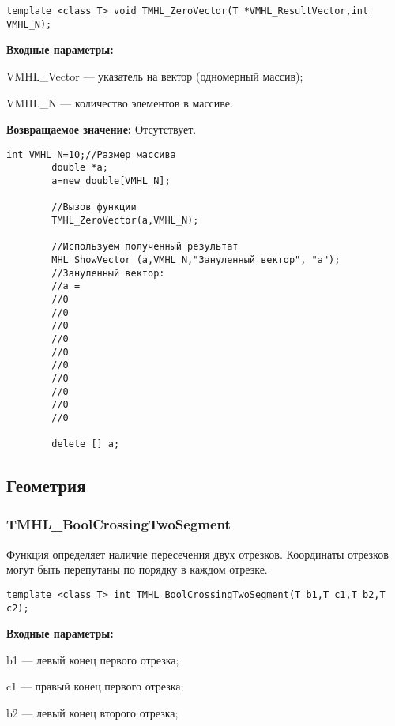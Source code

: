 \documentclass[a4paper,12pt]{article}
\begin{document}
\begin{lstlisting}[label=code_syntax_TMHL_ZeroVector,caption=Синтаксис]
template <class T> void TMHL_ZeroVector(T *VMHL_ResultVector,int VMHL_N);
\end{lstlisting}

\textbf{Входные параметры:}

 VMHL\_Vector --- указатель на вектор (одномерный массив);
 
 VMHL\_N --- количество элементов в массиве.

\textbf{Возвращаемое значение:}
Отсутствует.


\begin{lstlisting}[label=code_use_TMHL_ZeroVector,caption=Пример использования]
        int VMHL_N=10;//Размер массива
        double *a;
        a=new double[VMHL_N];

        //Вызов функции
        TMHL_ZeroVector(a,VMHL_N);

        //Используем полученный результат
        MHL_ShowVector (a,VMHL_N,"Зануленный вектор", "a");
        //Зануленный вектор:
        //a =
        //0
        //0
        //0
        //0
        //0
        //0
        //0
        //0
        //0
        //0

        delete [] a;
\end{lstlisting}

\subsection{Геометрия}

\subsubsection{TMHL\_BoolCrossingTwoSegment}\label{TMHL_BoolCrossingTwoSegment}

Функция определяет наличие пересечения двух отрезков. Координаты отрезков могут быть перепутаны по порядку в каждом отрезке.


\begin{lstlisting}[label=code_syntax_TMHL_BoolCrossingTwoSegment,caption=Синтаксис]
template <class T> int TMHL_BoolCrossingTwoSegment(T b1,T c1,T b2,T c2);
\end{lstlisting}

\textbf{Входные параметры:}  
 
b1 --- левый конец первого отрезка;
 
c1 --- правый конец первого отрезка;
 
b2 --- левый конец второго отрезка;
 
\end{document}
